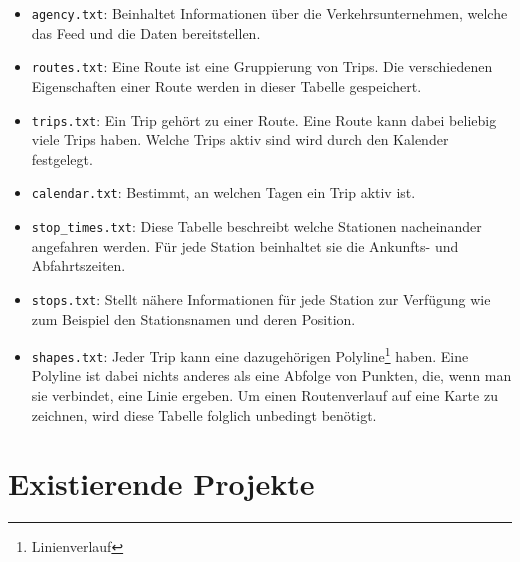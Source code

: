 \begin{newpage}
		\begin{itemize}
			\item \texttt{agency.txt}: Beinhaltet Informationen über die Verkehrsunternehmen, welche das Feed und die Daten bereitstellen.

			\item \texttt{routes.txt}: Eine Route ist eine Gruppierung von Trips. Die verschiedenen Eigenschaften einer Route werden in dieser Tabelle gespeichert.

			\item \texttt{trips.txt}: Ein Trip gehört zu einer Route. Eine Route kann dabei beliebig viele Trips haben. Welche Trips aktiv sind wird durch den Kalender festgelegt.

			\item \texttt{calendar.txt}: Bestimmt, an welchen Tagen ein Trip aktiv ist.

			\item \texttt{stop\_times.txt}: Diese Tabelle beschreibt welche Stationen nacheinander angefahren werden. Für jede Station beinhaltet sie die Ankunfts- und Abfahrtszeiten.

			\item \texttt{stops.txt}: Stellt nähere Informationen für jede Station zur Verfügung wie zum Beispiel den Stationsnamen und deren Position.

			\item \texttt{shapes.txt}: Jeder Trip kann eine dazugehörigen Polyline\footnote{Linienverlauf} haben. Eine Polyline ist dabei nichts anderes als eine Abfolge von Punkten, die, wenn man sie verbindet, eine Linie ergeben. Um einen Routenverlauf auf eine Karte zu zeichnen, wird diese Tabelle folglich unbedingt benötigt. 
		\end{itemize}

	\section{Existierende Projekte}
	\label{sec:existierende_projekte}

\end{newpage}
